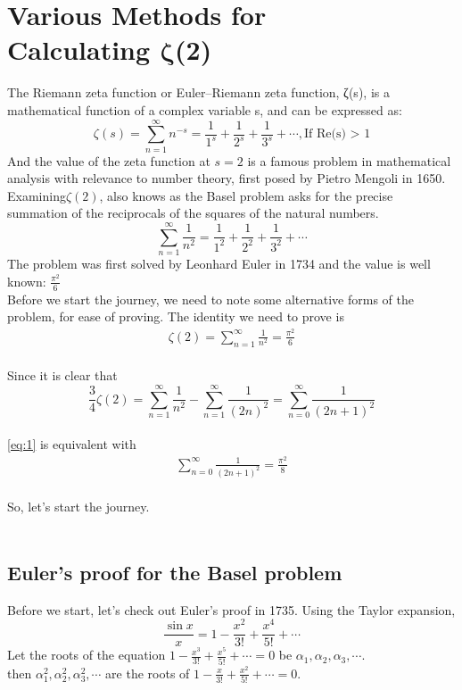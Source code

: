
\chapter*{Various Methods for \\Calculating $\boldsymbol\zeta$(2)}
\graphicspath{{./chap1/images/}}   
The Riemann zeta function or Euler–Riemann zeta function, ζ(s), is a mathematical function of a complex variable s, and can be expressed as:
\[
    \zeta(s) = \sum_{n=1}^\infty n^{-s} = \frac{1}{1^s} + \frac{1}{2^s} + \frac{1}{3^s} + \cdots, \textrm{If Re(s) > 1}
\]
And the value of the zeta function at $s = 2$ is a famous problem in mathematical analysis with relevance to number theory, first posed by Pietro Mengoli in 1650. Examining$\zeta(2)$, also knows as the Basel problem asks for the precise summation of the reciprocals of the squares of the natural numbers.
\[
    \sum_{n=1}^\infty \frac{1}{n^2} = \frac{1}{1^2} + \frac{1}{2^2} + \frac{1}{3^2} + \cdots
\]
The problem was first solved by Leonhard Euler in 1734 and the value is well known:  $\frac{\pi^2}{6}$
~\\





Before we start the journey, we need to note some alternative forms of the problem, for ease of proving. The identity we need to prove is
\begin{align}
    \zeta(2) = \sum_{n=1}^\infty \frac{1}{n^2} = \frac{\pi^2}{6} \tag{1}\label{eq:1}
\end{align}~\\
Since it is clear that
\[
    \frac{3}{4}\zeta(2) = \sum_{n=1}^\infty \frac{1}{n^2} -  \sum_{n=1}^\infty \frac{1}{(2n)^2}= \sum_{n=0}^\infty \frac{1}{(2n+1)^2} 
\]~\\
\eqref{eq:1} is equivalent with
\begin{align}
    \sum_{n=0}^\infty \frac{1}{(2n+1)^2} = \frac{\pi^2}{8} \tag{2}\label{eq:2}
\end{align}~\\


So, let's start the journey.\\
~\\
\section{Euler's proof for the Basel problem}
Before we start, let's check out Euler's proof in 1735. Using the Taylor expansion,
\[
    \frac{\sin x}{x} = 1 - \frac{x^2}{3!} + \frac{x^4}{5!}+\cdots
\]
Let the roots of the equation $1 - \frac{x^3}{3!} + \frac{x^5}{5!}+\cdots=0$ be $\alpha_1, \alpha_2, \alpha_3, \cdots$.\\
then $\alpha_1^2, \alpha_2^2, \alpha_3^2, \cdots$ are the roots of $1 - \frac{x}{3!} + \frac{x^2}{5!}+\cdots=0$.~\\

